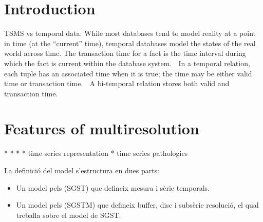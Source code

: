 


\section{Introduction}

TSMS vs temporal data: While most databases tend to model reality at a point in time (at the
“current” time), temporal databases model the states of the real world
across time.
 The transaction time for a fact is the time interval during which the fact
is current within the database system.
 In a temporal relation, each tuple has an associated time when it is true;
the time may be either valid time or transaction time.
 A bi-temporal relation stores both valid and transaction time.




















\section{Features of multiresolution}



* 
* 
* 
* time series representation
* time series pathologies


La definició del model s'estructura en dues parts:

\begin{itemize}
\item Un model pels (SGST)  que defineix mesura i sèrie temporals.
\item Un model pels (SGSTM) que defineix buffer, disc i subsèrie
  resolució, el qual treballa sobre el model de SGST.
\end{itemize}



